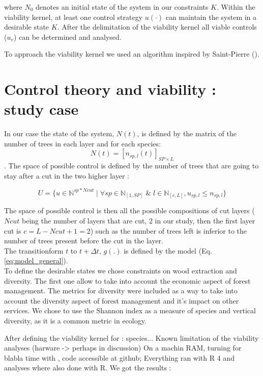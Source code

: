 \documentclass{article}
\begin{document}
where \(N_0\) denotes an initial state of the system in our constraints $K$. Within the viability kernel, at least one control strategy $u(\cdot)$ can maintain the system in a desirable state $K$. After the delimitation of the viability kernel all viable controls (\(u_v\)) can be determined and analysed.

To approach the viability kernel we used an algorithm inspired by Saint-Pierre (\autocite{saint-pierreApproximationViabilityKernel1994}).

\section{Control theory and viability : study case}

In our case the state of the system, \(N(t)\), is defined by the matrix of the number of trees in each layer and for each species: \[ N(t) = [n_{sp,l}(t)]_{SP \times L} \]. The space of possible control is defined by the number of trees that are going to stay after a cut in the two higher layer :

\[
     U = \{u \in \mathbb{N}^{sp*Ncut} \mid \forall sp \in \mathbb{N}_{[1,SP]} \; \& \; l \in \mathbb{N}_{[c,L]}, u_{sp,l} \leq n_{sp,l}\}
\]

The space of possible control is then all the possible compositions of cut layers ($Ncut$ being the number of layers that are cut, 2 in our study, then the first layer cut is $c = L-Ncut+1 = 2$) such as the number of trees left is inferior to the number of trees present before the cut in the layer.\\
The transitionform $t$ to $t + \Delta t$, $g(.)$ is defined by the model (Eq. \ref{eq:model_general}).\\

To define the desirable states we chose constraints on wood extraction and diversity. The first one allow to take into account the economic aspect of forest management. The metrics for diversity were included as a way to take into account the diversity aspect of forest management and it's impact on other services. We chose to use the Shannon index as a measure of species and vertical diversity, as it is a common metric in ecology.

After defining the viability kernel for : species...
Known limitation of the viability analyses (harware -> perhaps in discussion)
On a machin RAM, turning for blabla time with , code accessible at github; 
Everything ran with R 4 and analyses where also done with R.
We got the results :
\end{document}
